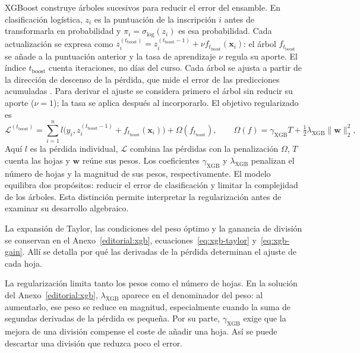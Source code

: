 XGBoost construye árboles sucesivos para reducir el error del ensamble. En clasificación logística, $z_i$ es la puntuación de la inscripción $i$ antes de transformarla en probabilidad y $\pi_i=\sigma_{\mathrm{log}}(z_i)$ es esa probabilidad. Cada actualización se expresa como $z_i^{(t_{\mathrm{boost}})}=z_i^{(t_{\mathrm{boost}}-1)}+\nu f_{t_{\mathrm{boost}}}(\mathbf{x}_{i})$: el árbol $f_{t_{\mathrm{boost}}}$ se añade a la puntuación anterior y la tasa de aprendizaje $\nu$ regula su aporte. El índice $t_{\mathrm{boost}}$ cuenta iteraciones, no días del curso. Cada árbol se ajusta a partir de la dirección de descenso de la pérdida, que mide el error de las predicciones acumuladas \cite{friedman2001}. Para derivar el ajuste se considera primero el árbol sin reducir su aporte ($\nu=1$); la tasa se aplica después al incorporarlo. El objetivo regularizado es
\begin{equation}\label{eq:xgb-obj}
\mathcal{L}^{(t_{\mathrm{boost}})}=\sum_{i=1}^{n}l\big(y_{i},z_i^{(t_{\mathrm{boost}}-1)}+f_{t_{\mathrm{boost}}}(\mathbf{x}_{i})\big)+\Omega(f_{t_{\mathrm{boost}}}),
\qquad
\Omega(f)=\gamma_{\mathrm{XGB}} T+\tfrac{1}{2}\lambda_{\mathrm{XGB}}\lVert\mathbf{w}\rVert_{2}^{2},
\end{equation}
Aquí $l$ es la pérdida individual, $\mathcal L$ combina las pérdidas con la penalización $\Omega$, $T$ cuenta las hojas y $\mathbf w$ reúne sus pesos. Los coeficientes $\gamma_{\mathrm{XGB}}$ y $\lambda_{\mathrm{XGB}}$ penalizan el número de hojas y la magnitud de sus pesos, respectivamente. El modelo equilibra dos propósitos: reducir el error de clasificación y limitar la complejidad de los árboles. Esta distinción permite interpretar la regularización antes de examinar su desarrollo algebraico.

La expansión de Taylor, las condiciones del peso óptimo y la ganancia de división se conservan en el Anexo~\ref{editorial:xgb}, ecuaciones~\eqref{eq:xgb-taylor} y~\eqref{eq:xgb-gain}. Allí se detalla por qué las derivadas de la pérdida determinan el ajuste de cada hoja. 

La regularización limita tanto los pesos como el número de hojas. En la solución del Anexo~\ref{editorial:xgb}, $\lambda_{\mathrm{XGB}}$ aparece en el denominador del peso: al aumentarlo, ese peso se reduce en magnitud, especialmente cuando la suma de segundas derivadas de la pérdida es pequeña. Por su parte, $\gamma_{\mathrm{XGB}}$ exige que la mejora de una división compense el coste de añadir una hoja. Así se puede descartar una división que reduzca poco el error.

